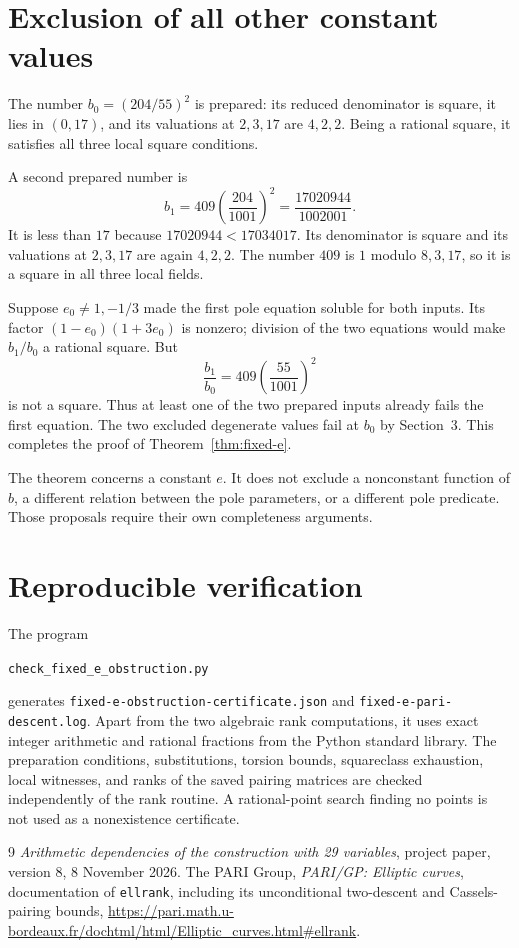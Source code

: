 \documentclass[11pt,a4paper]{article}
\theoremstyle{definition}\newtheorem{definition}[theorem]{Definition}
\begin{document}
\section{Exclusion of all other constant values}

The number $b_0=(204/55)^2$ is prepared: its reduced denominator
is square, it lies in $(0,17)$, and its valuations at $2,3,17$
are $4,2,2$.  Being a rational square, it satisfies all three
local square conditions.

A second prepared number is
\[
 b_1=409\left(\frac{204}{1001}\right)^2
       =\frac{17020944}{1002001}.
\]
It is less than $17$ because $17020944<17034017$.
Its denominator is square and its valuations at $2,3,17$ are
again $4,2,2$.  The number $409$ is $1$ modulo $8,3,17$,
so it is a square in all three local fields.

Suppose $e_0\ne1,-1/3$ made the first pole equation soluble
for both inputs.  Its factor $(1-e_0)(1+3e_0)$ is nonzero;
division of the two equations would make $b_1/b_0$ a rational
square.  But
\[
                     \frac{b_1}{b_0}=409\left(\frac{55}{1001}\right)^2
\]
is not a square.  Thus at least one of the two prepared inputs
already fails the first equation.  The two excluded degenerate
values fail at $b_0$ by Section~3.  This completes the proof of
Theorem~\ref{thm:fixed-e}.

The theorem concerns a constant $e$.  It does not exclude a
nonconstant function of $b$, a different relation between the pole
parameters, or a different pole predicate.  Those proposals require
their own completeness arguments.

\section*{Reproducible verification}

The program
\begin{center}\small
\nolinkurl{check_fixed_e_obstruction.py}
\end{center}
generates \nolinkurl{fixed-e-obstruction-certificate.json} and
\nolinkurl{fixed-e-pari-descent.log}.  Apart from the two algebraic
rank computations, it uses exact integer arithmetic and rational
fractions from the Python standard library.  The preparation
conditions, substitutions, torsion bounds, squareclass exhaustion,
local witnesses, and ranks of the saved pairing matrices are checked
independently of the rank routine.  A rational-point search finding
no points is not used as a nonexistence certificate.

\begin{thebibliography}{9}
\emph{Arithmetic dependencies of the construction with 29 variables},
project paper, version 8, 8 November 2026.
The PARI Group, \emph{PARI/GP: Elliptic curves}, documentation of
\texttt{ellrank}, including its unconditional two-descent and
Cassels-pairing bounds,
\url{https://pari.math.u-bordeaux.fr/dochtml/html/Elliptic_curves.html\#ellrank}.
\end{thebibliography}
\end{document}
